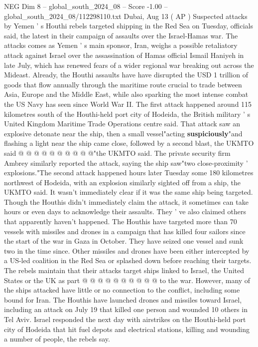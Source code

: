 \begin{textsample}{NEG Dim 8 – global\_south\_2024\_08 – Score -1.00 – global\_south\_2024\_08/112298110.txt}  \label{ex:f8_neg_284}
Dubai, Aug 13 ( AP ) Suspected attacks by Yemen ' s Houthi rebels targeted shipping in the Red Sea on Tuesday, officials said, the latest in their campaign of assaults over the Israel-Hamas war.
The attacks comes as Yemen ' s main sponsor, Iran, weighs a possible retaliatory attack against Israel over the assassination of Hamas official Ismail Haniyeh in late July, which has renewed fears of a wider regional war breaking out across the Mideast.
Already, the Houthi assaults have have disrupted the USD 1 trillion of goods that flow annually through the maritime route crucial to trade between Asia, Europe and the Middle East, while also sparking the most intense combat the US Navy has seen since World War II.
The first attack happened around 115 kilometres south of the Houthi-held port city of Hodeida, the British military ' s United Kingdom Maritime Trade Operations centre said.
That attack saw an explosive detonate near the ship, then a small vessel"acting \textbf{suspiciously}"and flashing a light near the ship came close, followed by a second blast, the UKMTO said @ @ @ @ @ @ @ @ @ @"the UKMTO said.
The private security firm Ambrey similarly reported the attack, saying the ship saw"two close-proximity ' explosions."The second attack happened hours later Tuesday some 180 kilometres northwest of Hodeida, with an explosion similarly sighted off from a ship, the UKMTO said.
It wasn't immediately clear if it was the same ship being targeted.
Though the Houthis didn't immediately claim the attack, it sometimes can take hours or even days to acknowledge their assaults.
They ' ve also claimed others that apparently haven't happened.
The Houthis have targeted more than 70 vessels with missiles and drones in a campaign that has killed four sailors since the start of the war in Gaza in October.
They have seized one vessel and sunk two in the time since.
Other missiles and drones have been either intercepted by a US-led coalition in the Red Sea or splashed down before reaching their targets.
The rebels maintain that their attacks target ships linked to Israel, the United States or the UK as part @ @ @ @ @ @ @ @ @ @ to the war.
However, many of the ships attacked have little or no connection to the conflict, including some bound for Iran.
The Houthis have launched drones and missiles toward Israel, including an attack on July 19 that killed one person and wounded 10 others in Tel Aviv.
Israel responded the next day with airstrikes on the Houthi-held port city of Hodeida that hit fuel depots and electrical stations, killing and wounding a number of people, the rebels say.

\end{textsample}
